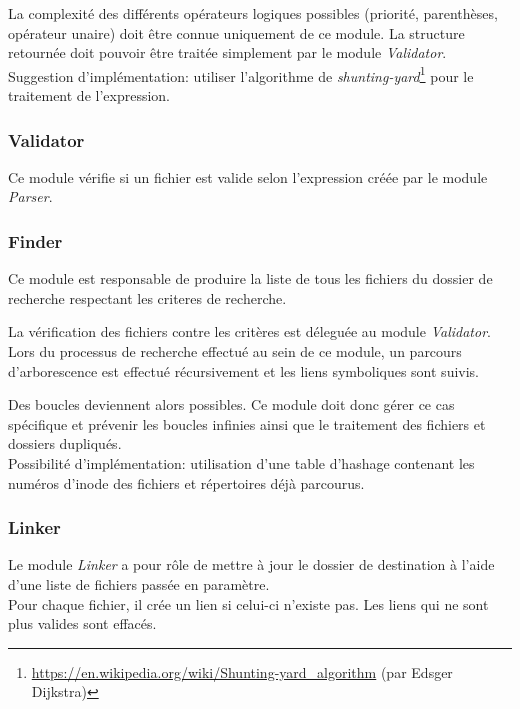 \documentclass[11pt, a4paper]{article}
\begin{document}
La complexité des différents opérateurs logiques possibles (priorité, parenthèses, opérateur unaire) doit être connue uniquement de ce module. La structure retournée doit pouvoir être traitée simplement par le module \textit{Validator}. \\

Suggestion d'implémentation: utiliser l'algorithme de \textit{shunting-yard}\footnote{\url{https://en.wikipedia.org/wiki/Shunting-yard\_algorithm} (par Edsger Dijkstra)} pour le traitement de l'expression.

\subsubsection{Validator}
Ce module vérifie si un fichier est valide selon l'expression créée par le module \textit{Parser}.

\subsubsection{Finder}
Ce module est responsable de produire la liste de tous les fichiers du dossier de recherche respectant les criteres de recherche.

La vérification des fichiers contre les critères est déleguée au module \textit{Validator}.\\

Lors du processus de recherche effectué au sein de ce module, un parcours d'arborescence est effectué récursivement et les liens symboliques sont suivis.

Des boucles deviennent alors possibles. Ce module doit donc gérer ce cas spécifique et prévenir les boucles infinies ainsi que le traitement des fichiers et dossiers dupliqués. \\

Possibilité d'implémentation: utilisation d'une table d'hashage contenant les numéros d'inode des fichiers et répertoires déjà parcourus.

\subsubsection{Linker}
Le module \textit{Linker} a pour rôle de mettre à jour le dossier de destination
à l'aide d'une liste de fichiers passée en paramètre. \\

Pour chaque fichier, il crée un lien si celui-ci n'existe pas. Les liens qui ne sont plus valides sont effacés.
\end{document}
